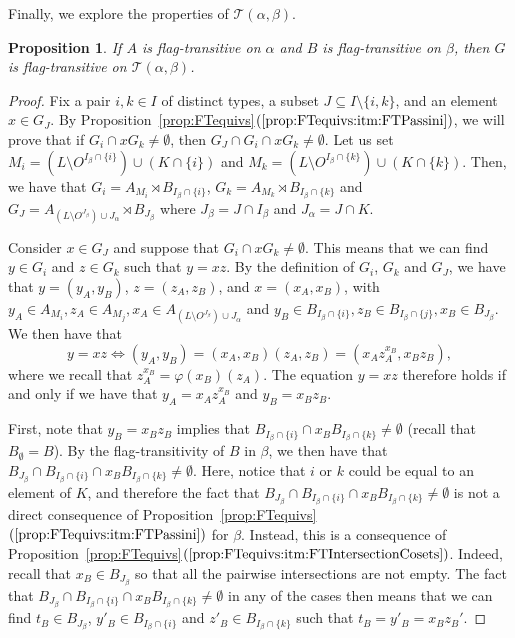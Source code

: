 \documentclass[11pt,letterpaper]{amsart}
\newtheorem{prop}{Proposition}[section]
\newcommand{\TT}{\mathcal{T}}
\begin{document}
Finally, we explore the properties of $\TT(\alpha,\beta)$.

\begin{prop}\label{prop:TwistingFT}
    If $A$ is flag-transitive on $\alpha$ and $B$ is flag-transitive on $\beta$, then $G$ is flag-transitive on $\TT(\alpha,\beta)$.
\end{prop}
\begin{proof}
    Fix a pair $i,k\in I$ of distinct types, a subset $J \subseteq I\setminus\{i,k\}$, and an element $x\in G_J$. By Proposition~\ref{prop:FTequivs}$(\ref{prop:FTequivs:itm:FTPassini})$, we will prove that if $G_i\cap xG_k\neq \emptyset$, then $G_J\cap G_i\cap xG_k\neq \emptyset$.
    Let us set $M_i = (L\setminus O^{I_\beta\cap \{i\}})\cup (K\cap \{i\})$ and $M_k = (L\setminus O^{I_\beta\cap \{k\}})\cup (K\cap \{k\})$. Then, we have that $G_i = A_{M_i} \rtimes B_{I_\beta \cap \{i\}}$, $G_k = A_{M_k} \rtimes B_{I_\beta \cap \{k\}}$ and $G_J =  A_{(L\setminus O^{J_\beta}) \cup J_\alpha}\rtimes B_{J_\beta}$ where $J_\beta = J \cap I_\beta$ and $J_\alpha = J \cap K$.

    Consider $x\in G_J$ and suppose that $G_i\cap xG_k\neq \emptyset$.
    This means that we can find $y\in G_i$ and $z\in G_k$ such that $y = xz$.
    By the definition of $G_i$, $G_k$ and $G_J$, we have that $y=(y_A,y_B)$, $z = (z_A,z_B)$, and $x = (x_A,x_B)$, with $y_A \in A_{M_i},z_A \in A_{M_j},x_A\in A_{(L \setminus O^{J_\beta}) \cup J_\alpha}$ and $y_B \in B_{I_\beta \cap \{i\}},z_B \in B_{I_\beta \cap \{j\}},x_B\in B_{J_\beta}$.
    We then have that $$y=xz \Leftrightarrow (y_A,y_B)=(x_A,x_B)(z_A,z_B) = (x_A z_A^{x_B},x_B z_B),$$
    where we recall that $ z_A^{x_B} = \varphi(x_B)(z_A)$. 
    The equation $y = xz$ therefore holds if and only if we have that $y_A = x_A z_A^{x_B}$ and $y_B = x_B z_B$.
    
    First, note that $y_B = x_B z_B$ implies that $B_{I_\beta\cap\{i\}}\cap x_B B_{I_\beta\cap\{k\}}\neq \emptyset$ (recall that $B_\emptyset = B$).
    By the flag-transitivity of $B$ in $\beta$, we then have that 
    $B_{J_\beta}\cap B_{I_\beta\cap\{i\}}\cap x_B B_{I_\beta\cap\{k\}}\neq \emptyset$. Here, notice that $i$ or $k$ could be equal to an element of $K$, and therefore the fact that $B_{J_\beta}\cap B_{I_\beta\cap\{i\}}\cap x_B B_{I_\beta\cap\{k\}}\neq \emptyset$ is not a direct consequence of Proposition~\ref{prop:FTequivs}$(\ref{prop:FTequivs:itm:FTPassini})$ for $\beta$. Instead, this is a consequence of Proposition~\ref{prop:FTequivs}$(\ref{prop:FTequivs:itm:FTIntersectionCosets})$. Indeed, recall that $x_B \in B_{J_\beta}$ so that all the pairwise intersections are not empty.
    The fact that $B_{J_\beta}\cap B_{I_\beta\cap\{i\}}\cap x_B B_{I_\beta\cap\{k\}}\neq \emptyset$ in any of the cases then means that we can find
    $t_B\in B_{J_\beta}$, $y'_B\in B_{I_\beta\cap\{i\}}$ and $z'_B\in B_{I_\beta\cap\{k\}}$ such that $t_B = y'_B = x_B z_B'$. 


\end{proof}
\end{document}
